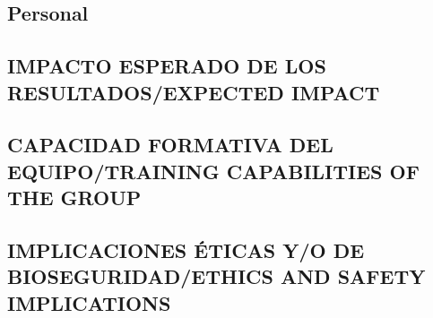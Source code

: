 \documentclass[a4paper,11pt,oneside]{article}
\begin{document}
\subsection*{\sc Personal}

\subsection{\sc IMPACTO ESPERADO DE LOS RESULTADOS/EXPECTED IMPACT}
\subsection{\sc CAPACIDAD FORMATIVA DEL EQUIPO/TRAINING CAPABILITIES OF THE GROUP}
\subsection{\sc IMPLICACIONES ÉTICAS Y/O DE BIOSEGURIDAD/ETHICS AND SAFETY IMPLICATIONS}
\end{document}
